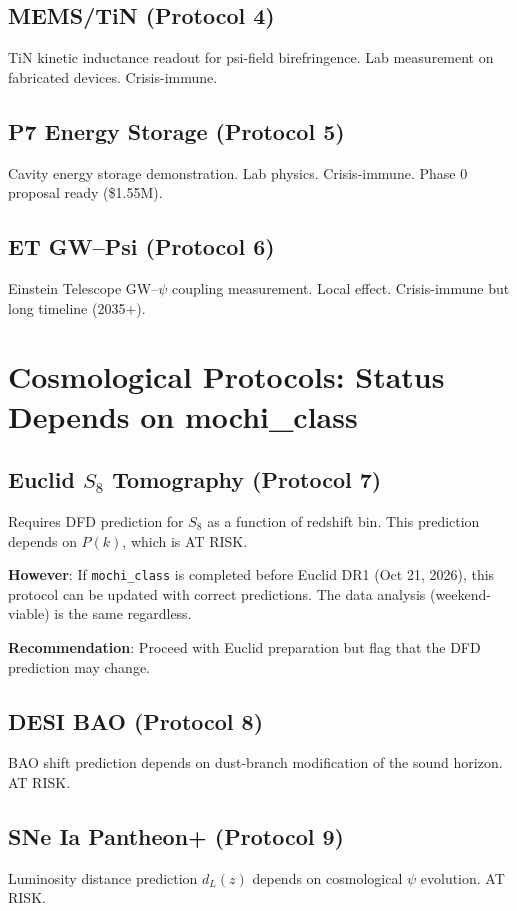\documentclass[11pt]{article}
\begin{document}
\subsection{MEMS/TiN (Protocol 4)}
TiN kinetic inductance readout for psi-field birefringence. Lab
measurement on fabricated devices. Crisis-immune.

\subsection{P7 Energy Storage (Protocol 5)}
Cavity energy storage demonstration. Lab physics. Crisis-immune.
Phase 0 proposal ready (\$1.55M).

\subsection{ET GW--Psi (Protocol 6)}
Einstein Telescope GW--$\psi$ coupling measurement. Local effect.
Crisis-immune but long timeline (2035+).

\section{Cosmological Protocols: Status Depends on mochi\_class}

\subsection{Euclid $S_8$ Tomography (Protocol 7)}
Requires DFD prediction for $S_8$ as a function of redshift bin.
This prediction depends on $P(k)$, which is AT RISK.

\textbf{However}: If \texttt{mochi\_class} is completed before Euclid DR1
(Oct 21, 2026), this protocol can be updated with correct predictions.
The data analysis (weekend-viable) is the same regardless.

\textbf{Recommendation}: Proceed with Euclid preparation but flag that
the DFD prediction may change.

\subsection{DESI BAO (Protocol 8)}
BAO shift prediction depends on dust-branch modification of the sound
horizon. AT RISK.

\subsection{SNe Ia Pantheon+ (Protocol 9)}
Luminosity distance prediction $d_L(z)$ depends on cosmological $\psi$
evolution. AT RISK.
\end{document}
